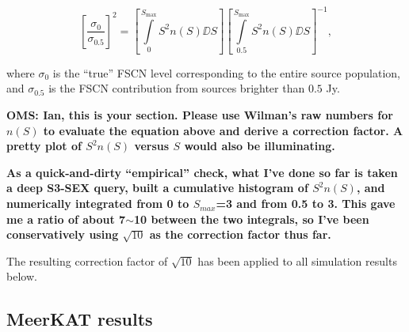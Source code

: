 \documentclass{aa}
\begin{document}
\begin{equation}
\left [ \frac{\sigma_\mathrm{0}}{\sigma_\mathrm{0.5}}\right ]^2 = 
\left [ \int\limits_{0}^{S_\mathrm{max}} S^2n(S)\DD{S} \right ] 
\left [ \int\limits_{0.5}^{S_\mathrm{max}} S^2n(S)\DD{S} \right ]^{-1},
\end{equation}

where $\sigma_0$ is the ``true'' FSCN level corresponding to the entire source population, and $\sigma_{0.5}$ is the FSCN contribution from sources brighter than $0.5$ Jy.

{\bf OMS: Ian, this is your section. Please use Wilman's raw numbers for $n(S)$ to evaluate the equation above and derive a correction factor. A pretty plot of $S^2n(S)$ versus $S$ would also be illuminating.}

{\bf As a quick-and-dirty ``empirical'' check, what I've done so far is taken a deep S3-SEX query, built a cumulative histogram of $S^2n(S)$, and numerically integrated from 0 to $S_{max}$=3 and from 0.5 to 3. This gave me a ratio of about 7$\sim$10 between the two integrals, so I've been conservatively using $\sqrt{10}$ as the correction factor thus far.}

The resulting correction factor of $\sqrt{10}$ has been applied to all simulation results below. 



\subsection{MeerKAT results}
\label{sec:meerkat-costcurve}
\end{document}
